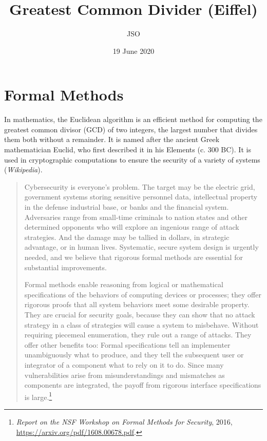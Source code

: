\documentclass[runningheads,12pt]{article}
\begin{document}
\title{Greatest Common Divider (Eiffel)}
\author{JSO}
\date{19 June 2020}

\maketitle
\tableofcontents

\section{Formal Methods}

In mathematics, the Euclidean algorithm is an efficient method for computing the greatest common divisor (GCD) of two integers, the largest number that divides them both without a remainder. It is named after the ancient Greek mathematician Euclid, who first described it in his Elements (c. 300 BC). It is used in cryptographic computations to ensure the security of a variety of systems (\textit{Wikipedia}). 

\begin{quote}
Cybersecurity is everyone’s problem. The target may be the electric grid, government systems storing sensitive personnel data, intellectual property in the defense industrial base, or banks and the financial system. Adversaries range from small-time criminals to nation states and other determined opponents who will explore an ingenious range of attack strategies. And the damage may be tallied in dollars, in strategic advantage, or in human lives. Systematic, secure system design is urgently needed, and we believe that rigorous formal methods are essential for substantial improvements.

Formal methods enable reasoning from logical or mathematical specifications of the behaviors of computing devices or processes; they offer rigorous proofs that all system behaviors meet some desirable property. They are crucial for security goals, because they can show that no attack strategy in a class of strategies will cause a system to misbehave. Without requiring piecemeal enumeration, they rule out a range of attacks. They offer other benefits too: Formal specifications tell an implementer unambiguously what to produce, and they tell the subsequent user or integrator of a component what to rely on it to do. Since many vulnerabilities arise from misunderstandings and mismatches as components are integrated, the payoff from rigorous interface specifications is large.\footnote{%
\textit{Report on the NSF Workshop on Formal Methods for Security}, 2016, \url{https://arxiv.org/pdf/1608.00678.pdf}.}
\end{quote}
\end{document}
